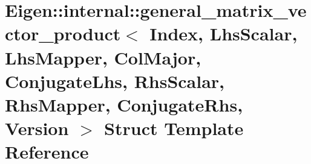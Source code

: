 \hypertarget{struct_eigen_1_1internal_1_1general__matrix__vector__product_3_01_index_00_01_lhs_scalar_00_01_l2767aff966c7bf3a7d425c9d340a95e8}{}\section{Eigen\+::internal\+::general\+\_\+matrix\+\_\+vector\+\_\+product$<$ Index, Lhs\+Scalar, Lhs\+Mapper, Col\+Major, Conjugate\+Lhs, Rhs\+Scalar, Rhs\+Mapper, Conjugate\+Rhs, Version $>$ Struct Template Reference}
\label{struct_eigen_1_1internal_1_1general__matrix__vector__product_3_01_index_00_01_lhs_scalar_00_01_l2767aff966c7bf3a7d425c9d340a95e8}
